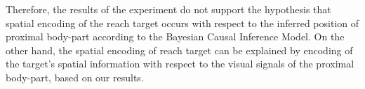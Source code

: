 Therefore, the results of the experiment do not support the hypothesis that spatial encoding of the reach target occurs with respect to the inferred position of proximal body-part according to the Bayesian Causal Inference Model. On the other hand, the spatial encoding of reach target can be explained by encoding of the target's spatial information with respect to the visual signals of the proximal body-part, based on our results. 













